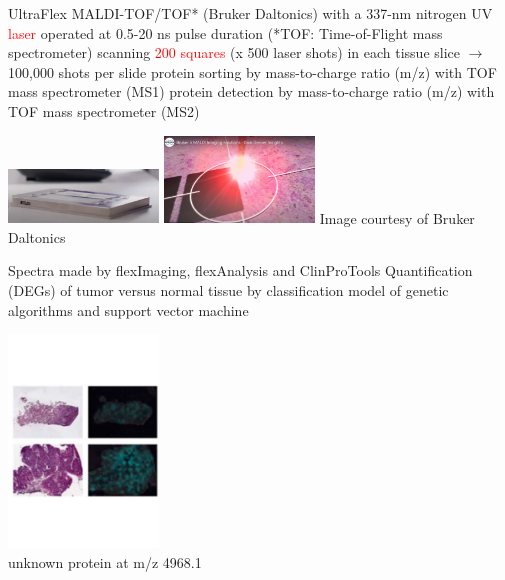 \documentclass[
paper=landscape,
paper=160mm:90mm, %
fontsize=11pt, %
pagesize, %
parskip=half-, %
]{scrartcl} %
\theoremstyle{mythmstyle} %
\begin{document}
{\clearpage
\begin{minipage}[c]{0.65\linewidth}
\begin{outline}
    \1 UltraFlex MALDI-TOF/TOF* (Bruker Daltonics) with a 337-nm nitrogen UV \textcolor{red}{laser} operated at 0.5-20 ns pulse duration
    {\tiny (*TOF: Time-of-Flight mass spectrometer)}
    \1 scanning \textcolor{red}{200 squares} (x 500 laser shots) in each tissue slice $\longrightarrow$ 100,000 shots per slide
    \1 protein sorting by mass-to-charge ratio (m/z) with TOF mass spectrometer (MS1)
    \1 protein detection by mass-to-charge ratio (m/z) with TOF mass spectrometer (MS2)
\end{outline}
\end{minipage}
\begin{minipage}[c]{0.25\linewidth}
\includegraphics[width=4cm]{MALDI_image_slide.jpg}
\includegraphics[width=4cm]{MALDI_image_demo.jpg}
{\tiny Image courtesy of Bruker Daltonics}
\end{minipage}
\clearpage

\begin{minipage}[c]{0.65\linewidth}
\begin{outline}
    \1 Spectra made by flexImaging,  flexAnalysis and ClinProTools
    \1 Quantification (DEGs) of tumor versus normal tissue by classification model of genetic algorithms and support vector machine
\end{outline}
\end{minipage}
\begin{minipage}[c]{0.35\linewidth}
\includegraphics[width=4cm]{Figure_MALDI_spectra.pdf}\\
\small unknown protein at m/z 4968.1
\end{minipage}


}
\end{document}
